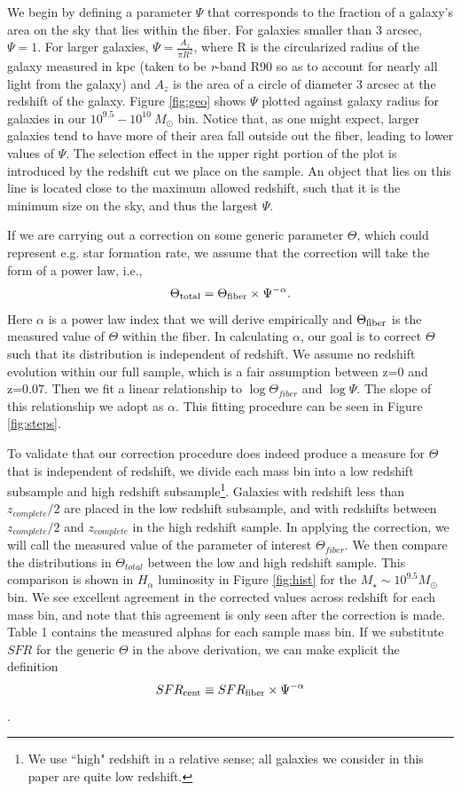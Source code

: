 \documentclass[iop]{emulateapj}
\begin{document}
We begin by defining a parameter $\Psi$ that corresponds to the fraction of a galaxy's area on the sky that lies within the fiber. For galaxies smaller than 3 arcsec, $\Psi = 1$. For larger galaxies, $\Psi = \frac{A_z}{\pi R^2}$, where R is the circularized radius of the galaxy measured in kpc (taken to be \textit{r}-band R90 so as to account for nearly all light from the galaxy) and $A_z$ is the area of a circle of diameter 3 arcsec at the redshift of the galaxy. Figure \ref{fig:geo} shows $\Psi$ plotted against galaxy radius for galaxies in our $10^{9.5}-10^{10}\ M_{\odot}$ bin. Notice that, as one might expect, larger galaxies tend to have more of their area fall outside out the fiber, leading to lower values of $\Psi$. The selection effect in the upper right portion of the plot is introduced by the redshift cut we place on the sample. An object that lies on this line is located close to the maximum allowed redshift, such that it is the minimum size on the sky, and thus the largest $\Psi$. 

If we are carrying out a correction on some generic parameter $\Theta$, which could represent e.g. star formation rate, we assume that the correction will take the form of a power law, i.e., $$\Theta_{\rm total} = \Theta_{\rm fiber} \times \Psi^{-\alpha}.$$ Here $\alpha$ is a power law index that we will derive empirically and $\Theta_{\rm fiber}$ is the measured value of $\Theta$ within the fiber. In calculating $\alpha$, our goal is to correct $\Theta$ such that its distribution is independent of redshift. We assume no redshift evolution within our full sample, which is a fair assumption between z=0 and z=0.07. Then we fit a linear relationship to $\log \Theta_{fiber}$ and $\log \Psi$. The slope of this relationship we adopt as $\alpha$. This fitting procedure can be seen in Figure \ref{fig:steps}.

To validate that our correction procedure does indeed produce a measure for $\Theta$ that is independent of redshift, we divide each mass bin into a low redshift subsample and high redshift subsample\footnote{We use ``high" redshift in a relative sense; all galaxies we consider in this paper are quite low redshift.}. Galaxies with redshift less than $z_{complete}/2$ are placed in the low redshift subsample, and with redshifts between $z_{complete}/2$ and  $z_{complete}$ in the high redshift sample. In applying the correction, we will call the measured value of the parameter of interest $\Theta_{fiber}$. We then compare the distributions in $\Theta_{total}$ between the low and high redshift sample. This comparison is shown in $H_\alpha$ luminosity in Figure \ref{fig:hist} for the $M_\star \sim 10^{9.5} M_{\odot}$ bin. We see excellent agreement in the corrected values across redshift for each mass bin, and note that this agreement is only seen after the correction is made. Table 1  contains the measured alphas for each sample mass bin. If we substitute $SFR$ for the generic $\Theta$ in the above derivation, we can make explicit the definition $$SFR_{\rm cent} \equiv SFR_{\rm fiber} \times \Psi^{-\alpha}$$.
\end{document}
